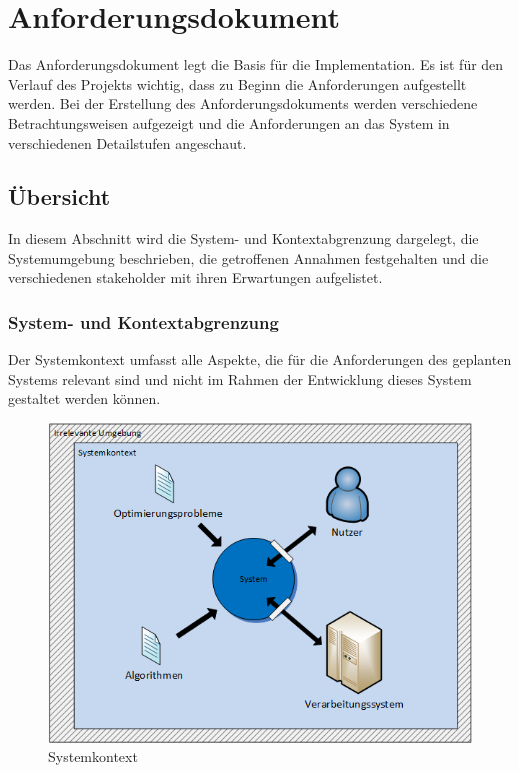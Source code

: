 %
%

\chapter{Anforderungsdokument \resultAssignment{[R3]}}\label{chap.anforderungsdokument}

Das Anforderungsdokument legt die Basis für die Implementation. Es ist für den Verlauf des Projekts wichtig, dass zu Beginn die Anforderungen aufgestellt werden. Bei der 
Erstellung des Anforderungsdokuments werden verschiedene Betrachtungsweisen aufgezeigt und die Anforderungen an das System in verschiedenen Detailstufen angeschaut.


\section{Übersicht}\label{anf_uebersicht}

In diesem Abschnitt  wird die System- und Kontextabgrenzung dargelegt, die Systemumgebung beschrieben, die getroffenen Annahmen festgehalten und die verschiedenen \gls{stakeholder} mit 
ihren Erwartungen aufgelistet.

\subsection{System- und Kontextabgrenzung}\label{systemabgrenzung}
Der Systemkontext umfasst alle Aspekte, die für die Anforderungen des geplanten Systems relevant sind und nicht im Rahmen der Entwicklung dieses System gestaltet werden können.
\cite{req_eng_book} 

\begin{figure}[h]
\centering
\includegraphics[scale=0.8]{images/visio/systemkontext.png}
\caption[Systemkontext]{Systemkontext \selfmade{}}
\label{fig:systemkontext}
\end{figure}

